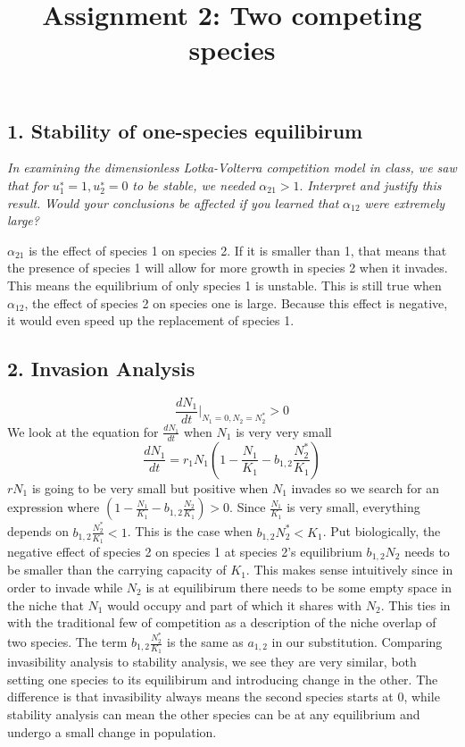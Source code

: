 \documentclass[
]{article}
\title{Assignment 2: Two competing species}
\author{}
\date{\vspace{-2.5em}}
\begin{document}
\maketitle

\hypertarget{stability-of-one-species-equilibirum}{%
\subsection{1. Stability of one-species
equilibirum}\label{stability-of-one-species-equilibirum}}

\emph{In examining the dimensionless Lotka-Volterra competition model in
class, we saw that for} \(u^∗_1 = 1, u^∗_2 = 0\) \emph{to be stable, we
needed} \(\alpha_{21} > 1\). \emph{Interpret and justify this result.}
\emph{Would your conclusions be affected if you learned that}
\(\alpha_{12}\) \emph{were extremely large?}

\(\alpha_{21}\) is the effect of species 1 on species 2. If it is
smaller than 1, that means that the presence of species 1 will allow for
more growth in species 2 when it invades. This means the equilibrium of
only species 1 is unstable. This is still true when \(\alpha_{12}\), the
effect of species 2 on species one is large. Because this effect is
negative, it would even speed up the replacement of species 1.

\hypertarget{invasion-analysis}{%
\subsection{2. Invasion Analysis}\label{invasion-analysis}}

\[\left. \frac{dN_1}{dt}\right. |_{N_1=0,N_2=N_2^*}>0\] We look at the
equation for \(\frac{dN_1}{dt}\) when \(N_1\) is very very small
\[\frac{dN_1}{dt}= r_1N_1(1-\frac{N_1}{K_1}-b_{1,2}\frac{N^*_2}{K_1})\]
\(rN_1\) is going to be very small but positive when \(N_1\) invades so
we search for an expression where
\((1-\frac{N_1}{K_1}-b_{1,2}\frac{N_2}{K_1})>0\). Since
\(\frac{N_1}{K_1}\) is very small, everything depends on
\(b_{1,2}\frac{N_2^*}{K_1}<1\). This is the case when
\(b_{1,2}N_2^*<K_1\). Put biologically, the negative effect of species 2
on species 1 at species 2's equilibrium \(b_{1,2}N_2\) needs to be
smaller than the carrying capacity of \(K_1\). This makes sense
intuitively since in order to invade while \(N_2\) is at equilibirum
there needs to be some empty space in the niche that \(N_1\) would
occupy and part of which it shares with \(N_2\). This ties in with the
traditional few of competition as a description of the niche overlap of
two species. The term \(b_{1,2}\frac{N_2^*}{K_1}\) is the same as
\(a_{1,2}\) in our substitution. Comparing invasibility analysis to
stability analysis, we see they are very similar, both setting one
species to its equilibirum and introducing change in the other. The
difference is that invasibility always means the second species starts
at 0, while stability analysis can mean the other species can be at any
equilibrium and undergo a small change in population.
\end{document}
